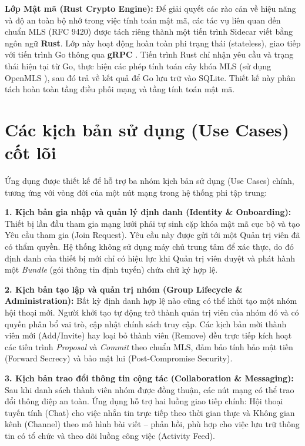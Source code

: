 \documentclass[../DoAn.tex]{subfiles}
\begin{document}
\textbf{Lớp Mật mã (Rust Crypto Engine):}
Để giải quyết các rào cản về hiệu năng và độ an toàn bộ nhớ trong việc tính toán mật mã, các tác vụ liên quan đến chuẩn MLS (RFC 9420) được tách riêng thành một tiến trình Sidecar viết bằng ngôn ngữ \textbf{Rust}. Lớp này hoạt động hoàn toàn phi trạng thái (stateless), giao tiếp với tiến trình Go thông qua \textbf{gRPC} \cite{grpc2026doc}. Tiến trình Rust chỉ nhận yêu cầu và trạng thái hiện tại từ Go, thực hiện các phép tính toán cây khóa MLS (sử dụng OpenMLS \cite{openmls2026doc}), sau đó trả về kết quả để Go lưu trữ vào SQLite. Thiết kế này phân tách hoàn toàn tầng điều phối mạng và tầng tính toán mật mã.

\section{Các kịch bản sử dụng (Use Cases) cốt lõi}

Ứng dụng được thiết kế để hỗ trợ ba nhóm kịch bản sử dụng (Use Cases) chính, tương ứng với vòng đời của một nút mạng trong hệ thống phi tập trung:

\textbf{1. Kịch bản gia nhập và quản lý định danh (Identity \& Onboarding):}
Thiết bị lần đầu tham gia mạng lưới phải tự sinh cặp khóa mật mã cục bộ và tạo Yêu cầu tham gia (Join Request). Yêu cầu này được gửi tới một Quản trị viên đã có thẩm quyền. Hệ thống không sử dụng máy chủ trung tâm để xác thực, do đó định danh của thiết bị mới chỉ có hiệu lực khi Quản trị viên duyệt và phát hành một \textit{Bundle} (gói thông tin định tuyến) chứa chữ ký hợp lệ.

\textbf{2. Kịch bản tạo lập và quản trị nhóm (Group Lifecycle \& Administration):}
Bất kỳ định danh hợp lệ nào cũng có thể khởi tạo một nhóm hội thoại mới. Người khởi tạo tự động trở thành quản trị viên của nhóm đó và có quyền phân bổ vai trò, cập nhật chính sách truy cập. Các kịch bản mời thành viên mới (Add/Invite) hay loại bỏ thành viên (Remove) đều trực tiếp kích hoạt các tiến trình \textit{Proposal} và \textit{Commit} theo chuẩn MLS, đảm bảo tính bảo mật tiến (Forward Secrecy) và bảo mật lui (Post-Compromise Security).

\textbf{3. Kịch bản trao đổi thông tin cộng tác (Collaboration \& Messaging):}
Sau khi danh sách thành viên nhóm được đồng thuận, các nút mạng có thể trao đổi thông điệp an toàn. Ứng dụng hỗ trợ hai luồng giao tiếp chính: Hội thoại tuyến tính (Chat) cho việc nhắn tin trực tiếp theo thời gian thực và Không gian kênh (Channel) theo mô hình bài viết -- phản hồi, phù hợp cho việc lưu trữ thông tin có tổ chức và theo dõi luồng công việc (Activity Feed).
\end{document}
